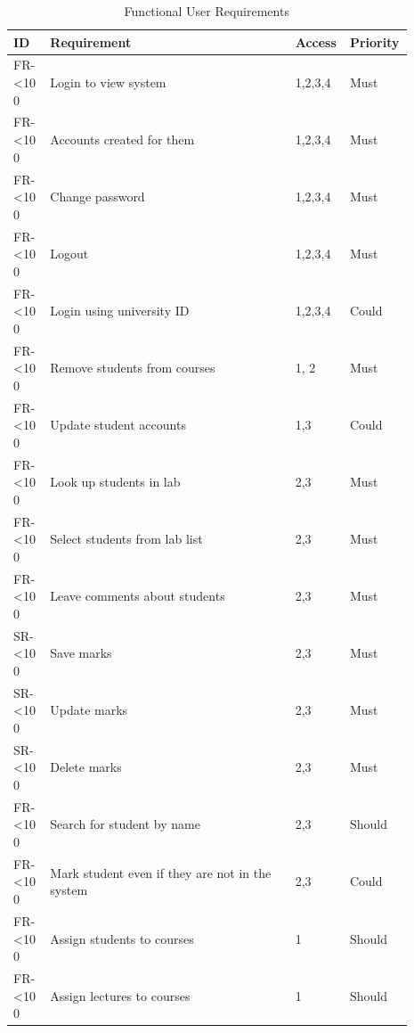 \documentclass[11pt]{report}
\newcommand{\rid}[1]{\centering #1-\ifnum\value{requirement}<10 0\fi\arabic{requirement}
\stepcounter{requirement}}
\begin{document}
\begin{spacing}{1.2}
\begin{longtable}{|p{0.09\linewidth}|p{0.6\linewidth}|p{0.1\linewidth}|
p{0.1\linewidth}|}
\caption{Functional User Requirements} \label{table:funct-user} \\ \hline
\textbf{ID} & \textbf{Requirement} & \textbf{Access} & \textbf{Priority}\\
\hline \hline

\rid{FR} &  Login to view system & 1,2,3,4 & Must\\ \hline
\rid{FR} &  Accounts created for them & 1,2,3,4 & Must\\ \hline
\rid{FR} &  Change password & 1,2,3,4 & Must\\ \hline
\rid{FR} &  Logout & 1,2,3,4 & Must \\ \hline
\rid{FR} &  Login using university ID & 1,2,3,4 & Could\\ \hline

\rid{FR} &  Remove students from courses & 1, 2 & Must\\ \hline
\rid{FR} &  Update student accounts & 1,3 & Could \\ \hline

\rid{FR} &  Look up students in lab & 2,3 & Must\\ \hline
\rid{FR} &  Select students from lab list & 2,3 & Must\\ \hline
\rid{FR} &  Leave comments about students & 2,3 & Must\\ \hline
\rid{SR} &  Save marks & 2,3 & Must\\ \hline
\rid{SR} &  Update marks & 2,3 & Must\\ \hline
\rid{SR} &  Delete marks & 2,3 & Must\\ \hline
\rid{FR} &  Search for student by name & 2,3 & Should\\ \hline
\rid{FR} &  Mark student even if they are not in the system & 2,3 & Could \\ \hline

\rid{FR} &  Assign students to courses & 1 & Should\\ \hline
\rid{FR} &  Assign lectures to courses & 1 & Should\\ \hline


\end{longtable}
\end{spacing}
\end{document}
